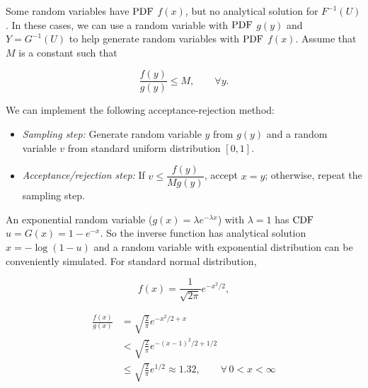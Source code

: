 


Some random variables have \(\mathrm{PDF}\) $f(x)$, but no analytical solution for $F^{-1}(U)$. In these
cases, we can use a random variable with \(\mathrm{PDF}\) $g(y)$ and $Y=G^{-1}(U)$ to help generate
random variables with \(\mathrm{PDF}\) $f(x)$. Assume that $M$ is a constant such that

\[
\frac{f(y)}{g(y)}\leq M,\qquad \forall y.
\]

We can implement the following acceptance-rejection method:

\begin{itemize}
\item \emph{Sampling step:} Generate random variable $y$ from $g(y)$ and a random variable $v$
from standard uniform distribution $[0,1]$.

\item \emph{Acceptance/rejection step:} If $v\leq\dfrac{f(y)}{Mg(y)}$, accept $x=y$; otherwise, repeat the
sampling step.\footnotemark[12]
\end{itemize}

An exponential random variable ($g(x)=\lambda e^{-\lambda x}$) with $\lambda=1$ has \(\mathrm{CDF}\)
$u=G(x)=1-e^{-x}$. So the inverse function has analytical solution $x=-\log(1-u)$ and a random
variable with exponential distribution can be conveniently simulated. For standard normal
distribution,

\[
f(x)=\frac{1}{\sqrt{2\pi}}e^{-x^2/2},
\]

\[
\begin{aligned}
\frac{f(x)}{g(x)}&=\sqrt{\frac{2}{\pi}}e^{-x^2/2+x}\\
&<\sqrt{\frac{2}{\pi}}e^{-(x-1)^2/2+1/2}\\
&\leq\sqrt{\frac{2}{\pi}}e^{1/2}\approx1.32,\qquad \forall\,0<x<\infty
\end{aligned}
\]

